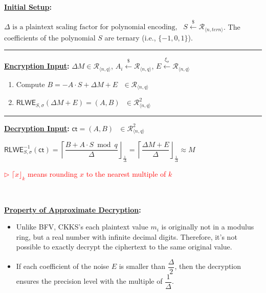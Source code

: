 \begin{tcolorbox}[title={\textbf{\tboxlabel{\ref*{subsec:ckks-enc-dec}} CKKS Encryption and Decryption}}]

\textbf{\underline{Initial Setup}:} 

$\Delta \text{ is a plaintext scaling factor for polynomial encoding}, \text{ } S \xleftarrow{\$} \mathcal{R}_{\langle n, \textit{tern} \rangle}$. The coefficients of the polynomial $S$ are ternary (i.e., $\{-1, 0, 1\}$).

\par\noindent\rule{\textwidth}{0.4pt}

\textbf{\underline{Encryption Input}:} $\Delta M \in \mathcal{R}_{\langle n, q \rangle}$, $A_i \xleftarrow{\$} \mathcal{R}_{\langle n, q \rangle}$, $E \xleftarrow{\xi_\sigma} \mathcal{R}_{\langle n, q \rangle}$


\begin{enumerate}

\item Compute $B = -A \cdot S + \Delta M + E \text{ } \in \mathcal{R}_{\langle n,q \rangle}$

\item $\textsf{RLWE}_{S,\sigma}(\Delta M + E) = (A, B) \text{ } \in \mathcal{R}_{\langle n,q \rangle}^2$ 

\end{enumerate}

\par\noindent\rule{\textwidth}{0.4pt}

\textbf{\underline{Decryption Input}:} $\textsf{ct} = (A, B) \text{ } \in \mathcal{R}_{\langle n,q \rangle}^2$

$\textsf{RLWE}^{-1}_{S,\sigma}(\textsf{ct}) = \left\lceil\dfrac{B + A \cdot S \bmod q}{\Delta}\right\rfloor_{\frac{1}{\Delta}} = \left\lceil\dfrac{\Delta M + E}{\Delta}\right\rfloor_{\frac{1}{\Delta}} \approx M$

\textcolor{red}{ $\rhd$ $\lceil x\rfloor_{k}$ means rounding $x$ to the nearest multiple of $k$}



$ $

\textbf{\underline{Property of Approximate Decryption}:}
\begin{itemize}
\item Unlike BFV, CKKS's each plaintext value $m_i$ is originally not in a modulus ring, but a real number with infinite decimal digits. Therefore, it's not possible to exactly decrypt the ciphertext to the same original value.
\item If each coefficient of the noise $E$ is smaller than $\dfrac{\Delta}{2}$, then the decryption ensures the precision level with the multiple of $\dfrac{1}{\Delta}$.  
\end{itemize}

\end{tcolorbox}


